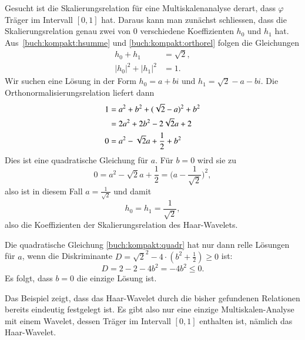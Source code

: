 \begin{beispiel}
Gesucht ist die Skalierungsrelation für eine Multiskalenanalyse derart,
dass $\varphi$ Träger im Intervall $[0,1]$ hat.
Daraus kann man zunächst schliessen, dass die Skalierungsrelation
genau zwei von $0$ verschiedene Koeffizienten $h_0$ und $h_1$ hat.
Aus~\eqref{buch:kompakt:hsumme} und \eqref{buch:kompakt:orthorel}
folgen die Gleichungen
\begin{align*}
h_0+h_1&=\sqrt{2},
\\
|h_0|^2+|h_1|^2&=1.
\end{align*}
Wir suchen eine Lösung in der Form $h_0=a+bi$ und $h_1=\sqrt{2}-a-bi$.
Die Orthonormalisierungsrelation liefert dann
\begin{align}
1
&=
a^2 + b^2
+
(\sqrt{2}-a)^2 + b^2
\notag
\\
&=
2a^2 + 2b^2 - 2\sqrt{2}a + 2
\notag
\\
0
&=
a^2 - \sqrt{2}a + \frac12 + b^2
\label{buch:kompakt:quadr}
\end{align}
Dies ist eine quadratische Gleichung für $a$.
Für $b=0$ wird sie zu
\[
0
=
a^2 - \sqrt{2}a + \frac12
=
\biggl(a-\frac1{\sqrt{2}}\biggr)^2,
\]
also ist in diesem Fall $a=\frac1{\sqrt{2}}$ und damit
\[
h_0=h_1=\frac{1}{\sqrt{2}},
\]
also die Koeffizienten der Skalierungsrelation des Haar-Wavelets.

Die quadratische Gleichung \eqref{buch:kompakt:quadr} hat nur dann
relle Lösungen für $a$, wenn die Diskriminante
$D=\sqrt{2}^2 - 4\cdot (b^2+\frac12) \ge 0$ ist:
\[
D=2-2-4b^2 =-4b^2\le 0.
\]
Es folgt, dass $b=0$ die einzige Lösung ist.
\end{beispiel}

Das Beispiel zeigt, dass das Haar-Wavelet durch die bisher gefundenen
Relationen bereits eindeutig festgelegt ist.
Es gibt also nur eine einzige Multiskalen-Analyse mit einem Wavelet,
dessen Träger im Intervall $[0,1]$ enthalten ist, nämlich das Haar-Wavelet.


